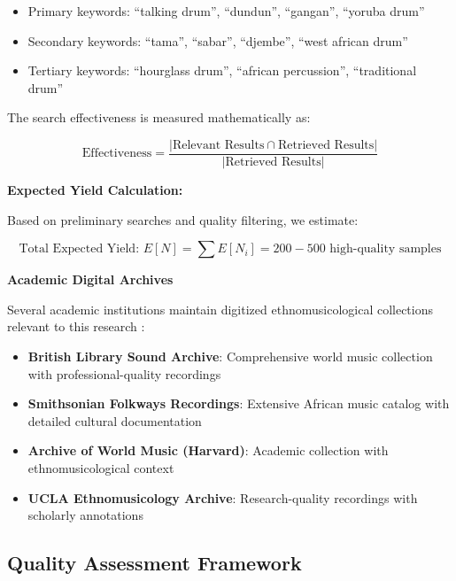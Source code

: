 \documentclass[12pt,a4paper]{article}
\begin{document}
\begin{itemize}
\item Primary keywords: ``talking drum'', ``dundun'', ``gangan'', ``yoruba drum''
\item Secondary keywords: ``tama'', ``sabar'', ``djembe'', ``west african drum''
\item Tertiary keywords: ``hourglass drum'', ``african percussion'', ``traditional drum''
\end{itemize}

The search effectiveness is measured mathematically as:

\begin{equation}
\text{Effectiveness} = \frac{|\text{Relevant Results} \cap \text{Retrieved Results}|}{|\text{Retrieved Results}|}
\end{equation}

\textbf{Expected Yield Calculation:}

Based on preliminary searches and quality filtering, we estimate:

\begin{equation}
\text{Total Expected Yield: } E[N] = \sum E[N_i] = 200-500 \text{ high-quality samples}
\end{equation}

\textbf{Academic Digital Archives}

Several academic institutions maintain digitized ethnomusicological collections relevant to this research \citep{seaman2011digital, proffitt2005preservation}:

\begin{itemize}
\item \textbf{British Library Sound Archive}: Comprehensive world music collection with professional-quality recordings
\item \textbf{Smithsonian Folkways Recordings}: Extensive African music catalog with detailed cultural documentation \citep{goldsmith2019smithsonian}
\item \textbf{Archive of World Music (Harvard)}: Academic collection with ethnomusicological context
\item \textbf{UCLA Ethnomusicology Archive}: Research-quality recordings with scholarly annotations
\end{itemize}

\subsection{Quality Assessment Framework}
\end{document}
